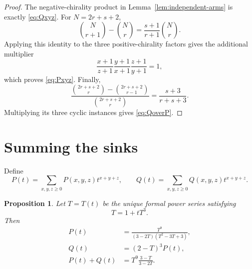 \documentclass[11pt]{amsart}
\newtheorem{proposition}[theorem]{Proposition}
\theoremstyle{definition}
\begin{document}
\begin{proof}
The negative-chirality product in Lemma~\ref{lem:independent-arms} is exactly
\eqref{eq:Qxyz}.  For $N=2r+s+2$,
\[
 \binom N{r+1}-\binom Nr
 =\frac{s+1}{r+1}\binom Nr.
\]
Applying this identity to the three positive-chirality factors gives the
additional multiplier
\[
 \frac{x+1}{z+1}\frac{y+1}{x+1}\frac{z+1}{y+1}=1,
\]
which proves \eqref{eq:Pxyz}.  Finally,
\[
 \frac{\binom{2r+s+2}{r}-\binom{2r+s+2}{r-1}}
      {\binom{2r+s+2}{r}}
 =\frac{s+3}{r+s+3}.
\]
Multiplying its three cyclic instances gives \eqref{eq:QoverP}.
\end{proof}

\section{Summing the sinks}

Define
\[
 P(t)=\sum_{x,y,z\geq0}P(x,y,z)t^{x+y+z},\qquad
 Q(t)=\sum_{x,y,z\geq0}Q(x,y,z)t^{x+y+z}.
\]

\begin{proposition}\label{prop:generating-functions}
Let $T=T(t)$ be the unique formal power series satisfying
\[
 T=1+tT^3.
\]
Then
\begin{align}
 P(t)&=\frac{T^9}{(3-2T)(T^2-3T+3)},\label{eq:Pgf}\\
 Q(t)&=(2-T)^3P(t),\label{eq:Qgf}\\
 P(t)+Q(t)&=T^9\frac{3-T}{3-2T}.\label{eq:Ygf}
\end{align}
\end{proposition}
\end{document}
